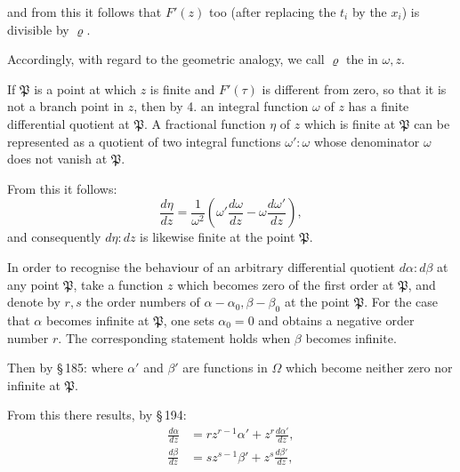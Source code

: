 and from this it follows that $F'(z)$ too (after replacing the $t_i$ by the $x_i$) is divisible by $\varrho$.

Accordingly, with regard to the geometric analogy, we call $\varrho$ the  in $\omega, z$.

If $\mathfrak{P}$ is a point at which $z$ is finite and $F'(\tau)$ is different from zero, so that it is not a branch point in $z$, then by 4. an integral function $\omega$ of $z$ has a finite differential quotient at $\mathfrak{P}$. A fractional function $\eta$ of $z$ which is finite at $\mathfrak{P}$ can be represented as a quotient of two integral functions $\omega' : \omega$ whose denominator $\omega$ does not vanish at $\mathfrak{P}$.

From this it follows:
\[
\frac{d\eta}{dz} = \frac{1}{\omega^2}\left(\omega'\frac{d\omega}{dz} - \omega\frac{d\omega'}{dz}\right),
\]
and consequently $d\eta : dz$ is likewise finite at the point $\mathfrak{P}$.

In order to recognise the behaviour of an arbitrary differential quotient $d\alpha : d\beta$ at any point $\mathfrak{P}$, take a function $z$ which becomes zero of the first order at $\mathfrak{P}$, and denote by $r, s$ the order numbers of $\alpha - \alpha_0, \beta - \beta_0$ at the point $\mathfrak{P}$. For the case that $\alpha$ becomes infinite at $\mathfrak{P}$, one sets $\alpha_0 = 0$ and obtains a negative order number $r$. The corresponding statement holds when $\beta$ becomes infinite.

Then by \S\,185:
where $\alpha'$ and $\beta'$ are functions in $\Omega$ which become neither zero nor infinite at $\mathfrak{P}$.

From this there results, by \S\,194:
\[
\begin{aligned}
\frac{d\alpha}{dz} &= r z^{r-1}\alpha' + z^r\frac{d\alpha'}{dz},\\
\frac{d\beta}{dz} &= s z^{s-1}\beta' + z^s\frac{d\beta'}{dz},
\end{aligned}
\]
